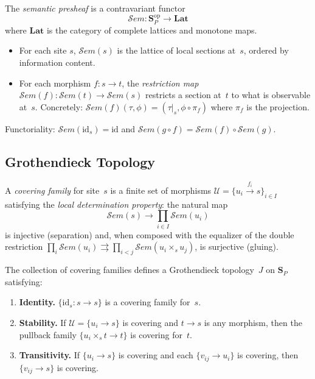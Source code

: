 \documentclass[acmsmall,screen]{acmart}
\theoremstyle{remark}
\newcommand{\Sem}{\mathcal{S}\mathit{em}}
\newcommand{\Lat}{\mathbf{Lat}}
\newcommand{\op}{\mathrm{op}}
\begin{document}
\begin{definition}\label{def:sem-presheaf}
The \emph{semantic presheaf} is a contravariant functor
\[
  \Sem : \mathbf{S}_P^{\op} \longrightarrow \Lat
\]
where $\Lat$ is the category of complete lattices and monotone maps.
\begin{itemize}[nosep]
  \item For each site $s$, $\Sem(s)$ is the lattice of local sections
    at~$s$, ordered by information content.
  \item For each morphism $f : s \to t$, the \emph{restriction map}
    $\Sem(f) : \Sem(t) \to \Sem(s)$ restricts a section at~$t$ to
    what is observable at~$s$.  Concretely: $\Sem(f)(\tau, \phi)
    = (\tau|_s, \phi \circ \pi_f)$ where $\pi_f$ is the projection.
\end{itemize}
Functoriality: $\Sem(\mathrm{id}_s) = \mathrm{id}$ and
$\Sem(g \circ f) = \Sem(f) \circ \Sem(g)$.
\end{definition}

\subsection{Grothendieck Topology}\label{sec:topology}

\begin{definition}\label{def:cover}
A \emph{covering family} for site~$s$ is a finite set of morphisms
$\mathcal{U} = \{ u_i \xrightarrow{f_i} s \}_{i \in I}$ satisfying
the \emph{local determination property}: the natural map
\[
  \Sem(s) \longrightarrow \prod_{i \in I} \Sem(u_i)
\]
is injective (separation) and, when composed with the equalizer
of the double restriction
$\prod_i \Sem(u_i) \rightrightarrows \prod_{i<j} \Sem(u_i \times_s u_j)$,
is surjective (gluing).
\end{definition}

\begin{definition}%
\label{def:grothendieck}
The collection of covering families defines a Grothendieck topology~$J$
on $\mathbf{S}_P$ satisfying:
\begin{enumerate}[nosep]
  \item \textbf{Identity.}
    $\{ \mathrm{id}_s : s \to s \}$ is a covering family for~$s$.
  \item \textbf{Stability.}
    If $\mathcal{U} = \{ u_i \to s \}$ is covering and $t \to s$ is any
    morphism, then the pullback family
    $\{ u_i \times_s t \to t \}$ is covering for~$t$.
  \item \textbf{Transitivity.}
    If $\{ u_i \to s \}$ is covering and each $\{ v_{ij} \to u_i \}$
    is covering, then $\{ v_{ij} \to s \}$ is covering.
\end{enumerate}
\end{definition}
\end{document}
